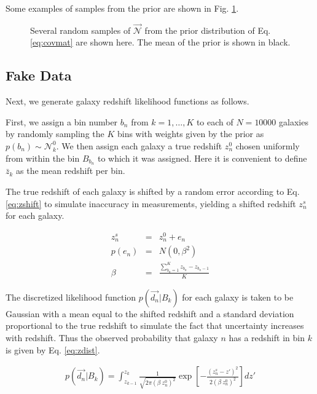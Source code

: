 \documentclass[12pt, onecolumn]{emulateapj}
\begin{document}
Some examples of samples from the prior are shown in Fig. \ref{fig:priors}.

\begin{figure}
\label{fig:priors}
\caption{Several random samples of $\vec{\mathcal{N}}$ from the prior distribution of Eq. \ref{eq:covmat} are shown here.  The mean of the prior is shown in black.}
\end{figure}

\subsection{Fake Data}

Next, we generate galaxy redshift likelihood functions as follows.  

First, we assign a bin number $b_{n}$ from $k=1,\dots,K$ to each of $N=10000$ galaxies by randomly sampling the $K$ bins with weights given by the prior as $p(b_{n})\sim\mathcal{N}^{0}_{k}$.  We then assign each galaxy a true redshift $z_{n}^{0}$ chosen uniformly from within the bin $B_{b_{n}}$ to which it was assigned.  Here it is convenient to define $\bar{z}_{k}$ as the mean redshift per bin.

The true redshift of each galaxy is shifted by a random error according to Eq. \ref{eq:zshift} to simulate inaccuracy in measurements, yielding a shifted redshift $z_{n}^{s}$ for each galaxy.  

\begin{mathletters}
\begin{eqnarray}
\label{eq:zshift}
z_{n}^{s} &=& z_{n}^{0}+e_{n}\\
p(e_{n}) &=& N(0,\beta^{2})\nonumber\\
\beta &=& \frac{\sum_{b_{n}=1}^{K}z_{b_{n}}-z_{b_{n}-1}}{K}\nonumber
\end{eqnarray}
\end{mathletters}

The discretized likelihood function $p(\vec{d_{n}}|B_{k})$ for each galaxy is taken to be Gaussian with a mean equal to the shifted redshift and a standard deviation proportional to the true redshift to simulate the fact that uncertainty increases with redshift.  Thus the observed probability that galaxy $n$ has a redshift in bin $k$ is given by Eq. \ref{eq:zdist}.

\begin{eqnarray}
\label{eq:zdist}
p(\vec{d_{n}}|B_{k}) = \int_{z_{k-1}}^{z_{k}} \frac{1}{\sqrt{2\pi(\beta\ z_{n}^{0})^{2}}}\exp\left[-\frac{(z_{n}^{s}-z')^{2}}{2(\beta\ z_{n}^{0})^{2}}\right]dz'
\end{eqnarray}
\end{document}
